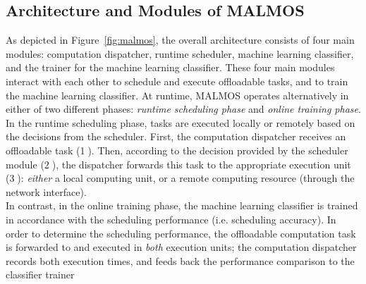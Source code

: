 \subsection{Architecture and Modules of MALMOS}
\label{online:module}
As depicted in Figure~\ref{fig:malmos}, the overall architecture consists
of four main modules: computation dispatcher, runtime scheduler, machine
learning classifier, and the trainer for the machine learning classifier.
%
These four main modules interact with each other to schedule and
execute offloadable tasks, and to train the machine learning
classifier. 
%
At runtime, MALMOS operates alternatively in either of two different phases:
\textit{runtime scheduling phase} and \textit{online training phase}.
%
In the runtime scheduling phase, tasks are executed locally or remotely
based on the decisions from the scheduler.
%
First, the computation dispatcher receives an offloadable task
(\textcircled{1}).
%
%
Then, according to the decision provided by the scheduler module
(\textcircled{2}), the dispatcher forwards this task to the appropriate
execution unit (\textcircled{3}): \textit{either} a local computing unit, or a
remote computing resource (through the network interface).\\
%
In contrast, in the online training phase, the machine
learning classifier is trained in accordance with the scheduling
performance (i.e. scheduling accuracy). 
%
In order to determine the scheduling performance, the offloadable
computation task is forwarded to and executed in \textit{both} execution
units; the computation dispatcher records both execution times, and
feeds back the performance comparison to the classifier trainer
